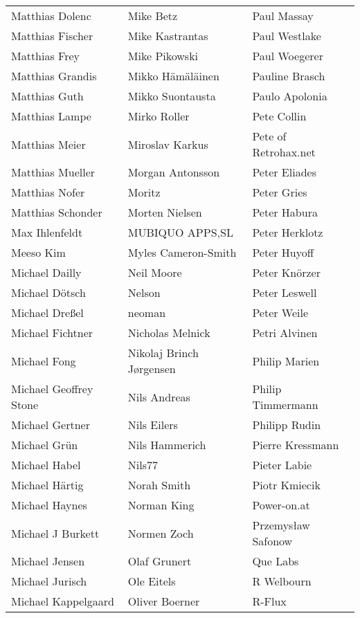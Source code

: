\begin{small}
\begin{tabular}{p{4cm}p{4cm}p{4cm}}
\end{tabular}
\newpage
\setlength{\tabcolsep}{1mm}
\begin{tabular}{p{4cm}p{4cm}p{4cm}}
Matthias Dolenc & Mike Betz & Paul Massay \\
Matthias Fischer & Mike Kastrantas & Paul Westlake \\
Matthias Frey & Mike Pikowski & Paul Woegerer \\
Matthias Grandis & Mikko Hämäläinen & Pauline Brasch \\
Matthias Guth & Mikko Suontausta & Paulo Apolonia \\
Matthias Lampe & Mirko Roller & Pete Collin \\
Matthias Meier & Miroslav Karkus & Pete of Retrohax.net \\
Matthias Mueller & Morgan Antonsson & Peter Eliades \\
Matthias Nofer & Moritz & Peter Gries \\
Matthias Schonder & Morten Nielsen & Peter Habura \\
Max Ihlenfeldt & MUBIQUO APPS,SL & Peter Herklotz \\
Meeso Kim & Myles Cameron-Smith & Peter Huyoff \\
Michael Dailly & Neil Moore & Peter Knörzer \\
Michael Dötsch & Nelson & Peter Leswell \\
Michael Dreßel & neoman & Peter Weile \\
Michael Fichtner & Nicholas Melnick & Petri Alvinen \\
Michael Fong & Nikolaj Brinch Jørgensen & Philip Marien \\
Michael Geoffrey Stone & Nils Andreas & Philip Timmermann \\
Michael Gertner & Nils Eilers & Philipp Rudin \\
Michael Grün & Nils Hammerich & Pierre Kressmann \\
Michael Habel & Nils77 & Pieter Labie \\
Michael Härtig & Norah Smith & Piotr Kmiecik \\
Michael Haynes & Norman King & Power-on.at \\
Michael J Burkett & Normen Zoch & Przemysław Safonow \\
Michael Jensen & Olaf Grunert & Que Labs \\
Michael Jurisch & Ole Eitels & R Welbourn \\
Michael Kappelgaard & Oliver Boerner & R-Flux \\

\end{tabular}
\end{small}
